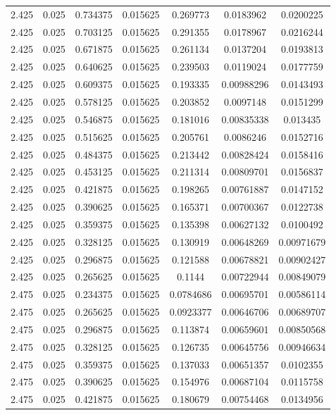 \begin{flushleft}
\begin{longtable}{ccccccc}
2.425 & 0.025 & 0.734375 & 0.015625 & 0.269773 & 0.0183962 & 0.0200225  \\ 
2.425 & 0.025 & 0.703125 & 0.015625 & 0.291355 & 0.0178967 & 0.0216244  \\ 
2.425 & 0.025 & 0.671875 & 0.015625 & 0.261134 & 0.0137204 & 0.0193813  \\ 
2.425 & 0.025 & 0.640625 & 0.015625 & 0.239503 & 0.0119024 & 0.0177759  \\ 
2.425 & 0.025 & 0.609375 & 0.015625 & 0.193335 & 0.00988296 & 0.0143493  \\ 
2.425 & 0.025 & 0.578125 & 0.015625 & 0.203852 & 0.0097148 & 0.0151299  \\ 
2.425 & 0.025 & 0.546875 & 0.015625 & 0.181016 & 0.00835338 & 0.013435  \\ 
2.425 & 0.025 & 0.515625 & 0.015625 & 0.205761 & 0.0086246 & 0.0152716  \\ 
2.425 & 0.025 & 0.484375 & 0.015625 & 0.213442 & 0.00828424 & 0.0158416  \\ 
2.425 & 0.025 & 0.453125 & 0.015625 & 0.211314 & 0.00809701 & 0.0156837  \\ 
2.425 & 0.025 & 0.421875 & 0.015625 & 0.198265 & 0.00761887 & 0.0147152  \\ 
2.425 & 0.025 & 0.390625 & 0.015625 & 0.165371 & 0.00700367 & 0.0122738  \\ 
2.425 & 0.025 & 0.359375 & 0.015625 & 0.135398 & 0.00627132 & 0.0100492  \\ 
2.425 & 0.025 & 0.328125 & 0.015625 & 0.130919 & 0.00648269 & 0.00971679  \\ 
2.425 & 0.025 & 0.296875 & 0.015625 & 0.121588 & 0.00678821 & 0.00902427  \\ 
2.425 & 0.025 & 0.265625 & 0.015625 & 0.1144 & 0.00722944 & 0.00849079  \\ 
2.475 & 0.025 & 0.234375 & 0.015625 & 0.0784686 & 0.00695701 & 0.00586114  \\ 
2.475 & 0.025 & 0.265625 & 0.015625 & 0.0923377 & 0.00646706 & 0.00689707  \\ 
2.475 & 0.025 & 0.296875 & 0.015625 & 0.113874 & 0.00659601 & 0.00850568  \\ 
2.475 & 0.025 & 0.328125 & 0.015625 & 0.126735 & 0.00645756 & 0.00946634  \\ 
2.475 & 0.025 & 0.359375 & 0.015625 & 0.137033 & 0.00651357 & 0.0102355  \\ 
2.475 & 0.025 & 0.390625 & 0.015625 & 0.154976 & 0.00687104 & 0.0115758  \\ 
2.475 & 0.025 & 0.421875 & 0.015625 & 0.180679 & 0.00754468 & 0.0134956  \\ 

\end{longtable}
\end{flushleft}
